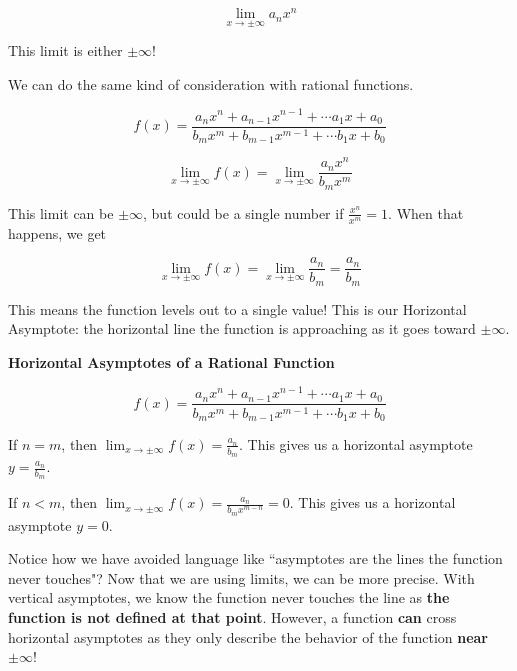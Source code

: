 \documentclass{ximera}
\begin{document}
$$ \lim_{x \rightarrow \pm \infty} a_n x^n $$

This limit is either $\pm \infty$! 

We can do the same kind of consideration with rational functions.  

$$ f(x) = \frac{a_nx^n + a_{n-1}x^{n-1} + \cdots a_1 x + a_0}{b_mx^m + b_{m-1}x^{m-1} + \cdots b_1 x + b_0}$$ 

$$ \lim_{x \rightarrow \pm \infty} f(x) = \lim_{x \rightarrow \pm \infty} \frac{a_n x^n}{b_m x^m} $$

This limit can be $\pm \infty$, but could be a single number if $\frac{x^n}{x^m} = 1$. When that happens, we get 

$$ \lim_{x \rightarrow \pm \infty} f(x) = \lim_{x \rightarrow \pm \infty} \frac{a_n}{b_m} = \frac{a_n}{b_m}$$

This means the function levels out to a single value! This is our Horizontal Asymptote: the horizontal line the function is approaching as it goes toward $\pm \infty$. 

\begin{theorem}
\textbf{Horizontal Asymptotes of a Rational Function}

$$ f(x) = \frac{a_nx^n + a_{n-1}x^{n-1} + \cdots a_1 x + a_0}{b_mx^m + b_{m-1}x^{m-1} + \cdots b_1 x + b_0} $$

If $n = m$, then $\lim_{x \rightarrow \pm \infty} f(x) = \frac{a_n}{b_m}$. This gives us a horizontal asymptote $y = \frac{a_n}{b_m}$.

If $n < m$, then $\lim_{x \rightarrow \pm \infty} f(x) = \frac{a_n}{b_m x^{m-n}} = 0$. This gives us a horizontal asymptote $y=0$. 
\end{theorem}

Notice how we have avoided language like ``asymptotes are the lines the function never touches"? Now that we are using limits, we can be more precise. With vertical asymptotes, we know the function never touches the line as \textbf{the function is not defined at that point}. However, a function \textbf{can} cross horizontal asymptotes as they only describe the behavior of the function \textbf{near $\pm \infty$}!
\end{document}
